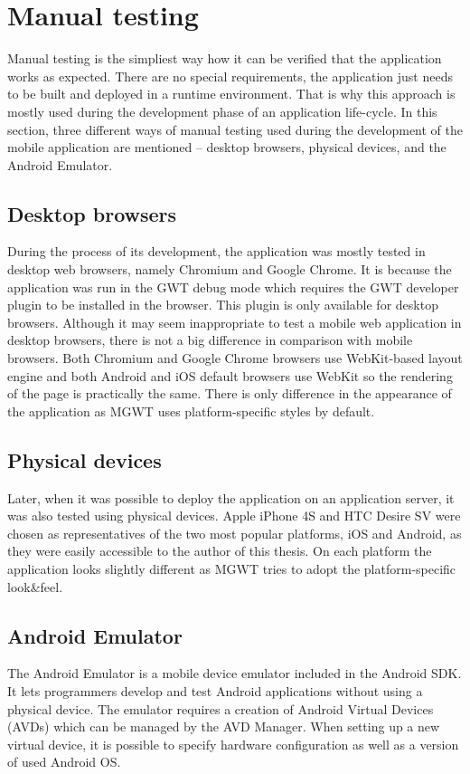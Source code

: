\documentclass[12pt,oneside,final]{fithesis2}
\begin{document}
\section{Manual testing}
Manual testing is the simpliest way how it can be verified that the application works as expected.
There are no special requirements, the application just needs to be built and deployed in a runtime environment.
That is why this approach is mostly used during the development phase of an application life-cycle.
In this section, three different ways of manual testing used during the development of the mobile application are mentioned -- desktop browsers, physical devices, and the Android Emulator.

\subsection{Desktop browsers}
During the process of its development, the application was mostly tested in desktop web browsers, namely Chromium and Google Chrome.
It is because the application was run in the GWT debug mode which requires the GWT developer plugin to be installed in the browser.
This plugin is only available for desktop browsers.
Although it may seem inappropriate to test a mobile web application in desktop browsers, there is not a big difference in comparison with mobile browsers.
Both Chromium and Google Chrome browsers use WebKit-based layout engine and both Android and iOS default browsers use WebKit so the rendering of the page is practically the same.
There is only difference in the appearance of the application as MGWT uses platform-specific styles by default.

\subsection{Physical devices}
Later, when it was possible to deploy the application on an application server, it was also tested using physical devices.
Apple iPhone 4S and HTC Desire SV were chosen as representatives of the two most popular platforms, iOS and Android, as they were easily accessible to the author of this thesis.
On each platform the application looks slightly different as MGWT tries to adopt the platform-specific look\&feel.

\subsection{Android Emulator}
The Android Emulator is a mobile device emulator included in the Android SDK\footnotemark{}.
It lets programmers develop and test Android applications without using a physical device.
The emulator requires a creation of Android Virtual Devices (AVDs) which can be managed by the AVD Manager.
When setting up a new virtual device, it is possible to specify hardware configuration as well as a version of used Android OS.
\end{document}
